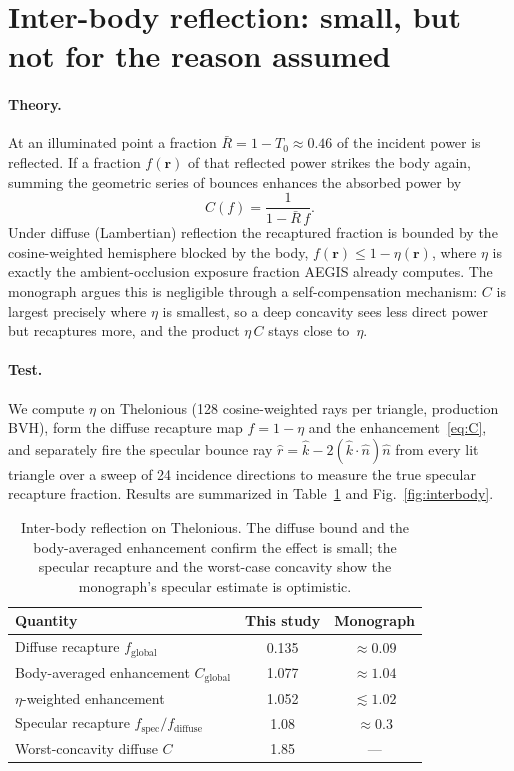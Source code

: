 \documentclass[11pt]{article}
\newcommand{\khat}{\ensuremath{\hat{k}}}
\newcommand{\nhat}{\ensuremath{\hat{n}}}
\newcommand{\rr}{\ensuremath{\mathbf{r}}}
\newcommand{\Rbar}{\ensuremath{\bar{R}}}
\begin{document}
\section{Inter-body reflection: small, but not for the reason assumed}

\paragraph{Theory.} At an illuminated point a fraction
$\Rbar = 1-T_0 \approx 0.46$ of the incident power is reflected. If a
fraction $f(\rr)$ of that reflected power strikes the body again, summing
the geometric series of bounces enhances the absorbed power by
\begin{equation}\label{eq:C}
  C(f) = \frac{1}{1-\Rbar\,f}.
\end{equation}
Under diffuse (Lambertian) reflection the recaptured fraction is bounded by
the cosine-weighted hemisphere blocked by the body, $f(\rr)\le 1-\eta(\rr)$,
where $\eta$ is exactly the ambient-occlusion exposure fraction AEGIS
already computes. The monograph argues this is negligible through a
self-compensation mechanism: $C$ is largest precisely where $\eta$ is
smallest, so a deep concavity sees less direct power but recaptures more,
and the product $\eta\,C$ stays close to~$\eta$.

\paragraph{Test.} We compute $\eta$ on Thelonious (\num{128} cosine-weighted
rays per triangle, production BVH), form the diffuse recapture map
$f = 1-\eta$ and the enhancement~\eqref{eq:C}, and separately fire the
specular bounce ray $\hat r = \khat - 2(\khat\cdot\nhat)\nhat$ from every
lit triangle over a sweep of \num{24} incidence directions to measure the
true specular recapture fraction. Results are summarized in
Table~\ref{tab:interbody} and Fig.~\ref{fig:interbody}.

\begin{table}[!htb]
\centering
\caption{Inter-body reflection on Thelonious. The diffuse bound and the
body-averaged enhancement confirm the effect is small; the specular
recapture and the worst-case concavity show the monograph's specular
estimate is optimistic.}
\label{tab:interbody}
\begin{tabular}{lcc}
\toprule
Quantity & This study & Monograph \\
\midrule
Diffuse recapture $f_{\mathrm{global}}$ & 0.135 & $\approx 0.09$ \\
Body-averaged enhancement $C_{\mathrm{global}}$ & 1.077 & $\approx 1.04$ \\
$\eta$-weighted enhancement & 1.052 & $\lesssim 1.02$ \\
Specular recapture $f_{\mathrm{spec}}/f_{\mathrm{diffuse}}$ & 1.08 & $\approx 0.3$ \\
Worst-concavity diffuse $C$ & 1.85 & --- \\
\bottomrule
\end{tabular}
\end{table}
\end{document}
